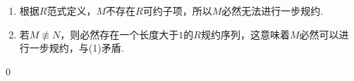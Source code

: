 \begin{pf} \rm \;
    \begin{enumerate}
        \item 根据$R$范式定义，$M$不存在$R$可约子项，所以$M$必然无法进行一步规约.
        \item 若$M\not\equiv N$，则必然存在一个长度大于$1$的$R$规约序列，这意味着$M$必然可以进行一步规约，与(1)矛盾.
    \end{enumerate}
    \qed 
\end{pf}